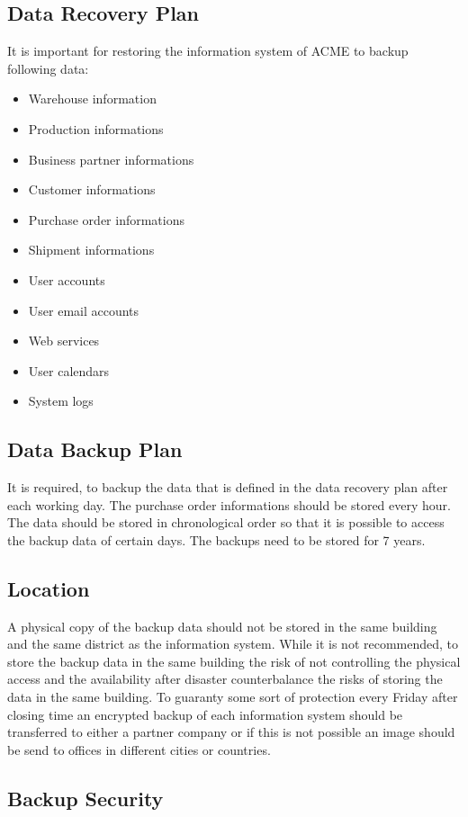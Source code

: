 \documentclass[12pt]{article}
\begin{document}
\subsection{Data Recovery Plan}
It is important for restoring the information system of ACME to backup following data:
\begin{itemize}
\item Warehouse information
\item Production informations
\item Business partner informations
\item Customer informations
\item Purchase order informations
\item Shipment informations
\item User accounts
\item User email accounts
\item Web services
\item User calendars
\item System logs
\end{itemize}
\subsection{Data Backup Plan}
It is required, to backup the data that is defined in the data recovery  plan after each working day. The purchase order informations should be stored every hour. The data should be stored in chronological order so that it is possible to access the backup data of certain days. The backups need to be stored for 7 years.   
\subsection{Location}
A physical copy of the backup data should not be stored in the same building and the same district as the information system. While it is not recommended, to store the backup data in the same building the risk of not controlling the physical access and the availability after disaster counterbalance the risks of storing the data in the same building. To guaranty some sort of protection every Friday after closing time an encrypted backup of each information system should be transferred to either a partner company or if this is not possible an image should be send to offices in different cities or countries.   
\subsection{Backup Security}
\end{document}
